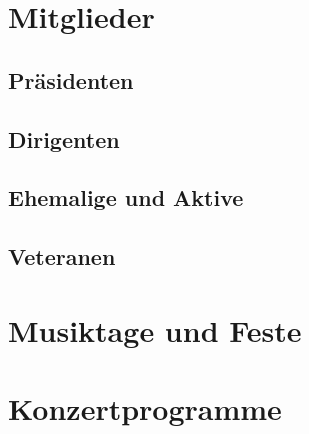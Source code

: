\documentclass[]{book}
\begin{document}
\part{Mitglieder}

\chapter{Präsidenten}


\chapter{Dirigenten}


\chapter{Ehemalige und Aktive}


\chapter{Veteranen}



\part{Musiktage und Feste}







\part{Konzertprogramme}



% 

\backmatter
\end{document}
